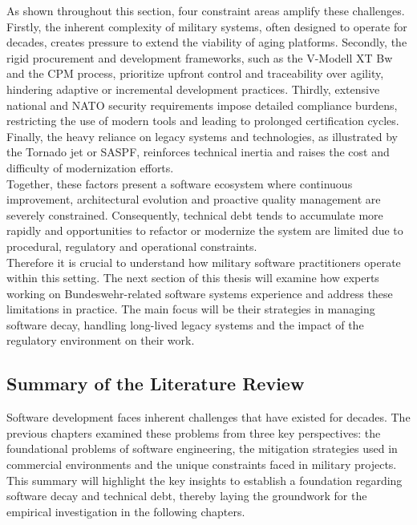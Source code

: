 As shown throughout this section, four constraint areas amplify these challenges. Firstly, the inherent complexity of military systems, often designed to operate for decades, creates pressure to extend the viability of aging platforms.
Secondly, the rigid procurement and development frameworks, such as the V-Modell XT Bw and the \ac{CPM} process, prioritize upfront control and traceability over agility, hindering adaptive or incremental development practices.
Thirdly, extensive national and NATO security requirements impose detailed compliance burdens, restricting the use of modern tools and leading to prolonged certification cycles. Finally, the heavy reliance on legacy systems and technologies, as illustrated by the Tornado jet or SASPF, 
reinforces technical inertia and raises the cost and difficulty of modernization efforts.\\

Together, these factors present a software ecosystem where continuous improvement, architectural evolution and proactive quality management are severely constrained. Consequently, technical debt tends to accumulate more rapidly and opportunities to refactor or modernize the system are limited due to
procedural, regulatory and operational constraints.\\

Therefore it is crucial to understand how military software practitioners operate within this setting. The next section of this thesis will examine how experts working on Bundeswehr-related software systems experience and address these limitations in practice.
The main focus will be their strategies in managing software decay, handling long-lived legacy systems and the impact of the regulatory environment on their work.

\subsection{Summary of the Literature Review}
Software development faces inherent challenges that have existed for decades. The previous chapters examined these problems from three key perspectives: the foundational problems of software engineering, the mitigation strategies used in commercial environments and the unique constraints faced in military projects.
This summary will highlight the key insights to establish a foundation regarding software decay and technical debt, thereby laying the groundwork for the empirical investigation in the following chapters.\\

